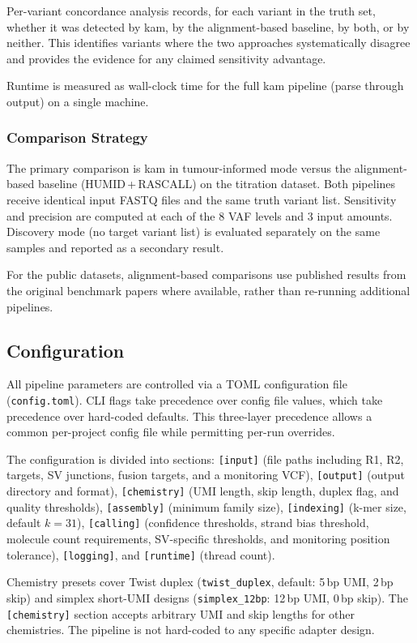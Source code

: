 Per-variant concordance analysis records, for each variant in the truth set, whether it was detected by kam, by the alignment-based baseline, by both, or by neither.
This identifies variants where the two approaches systematically disagree and provides the evidence for any claimed sensitivity advantage.

Runtime is measured as wall-clock time for the full kam pipeline (parse through output) on a single machine.

\subsubsection{Comparison Strategy}

The primary comparison is kam in tumour-informed mode versus the alignment-based baseline (HUMID\,+\,RASCALL) on the titration dataset.
Both pipelines receive identical input FASTQ files and the same truth variant list.
Sensitivity and precision are computed at each of the 8 VAF levels and 3 input amounts.
Discovery mode (no target variant list) is evaluated separately on the same samples and reported as a secondary result.

For the public datasets, alignment-based comparisons use published results from the original benchmark papers where available, rather than re-running additional pipelines.

\subsection{Configuration}
\label{sec:method:config}

All pipeline parameters are controlled via a TOML configuration file (\texttt{config.toml}). CLI flags take precedence over config file values, which take precedence over hard-coded defaults. This three-layer precedence allows a common per-project config file while permitting per-run overrides.

The configuration is divided into sections: \texttt{[input]} (file paths including R1, R2, targets, SV junctions, fusion targets, and a monitoring VCF), \texttt{[output]} (output directory and format), \texttt{[chemistry]} (UMI length, skip length, duplex flag, and quality thresholds), \texttt{[assembly]} (minimum family size), \texttt{[indexing]} (k-mer size, default $k = 31$), \texttt{[calling]} (confidence thresholds, strand bias threshold, molecule count requirements, SV-specific thresholds, and monitoring position tolerance), \texttt{[logging]}, and \texttt{[runtime]} (thread count).

Chemistry presets cover Twist duplex (\texttt{twist\_duplex}, default: 5\,bp UMI, 2\,bp skip) and simplex short-UMI designs (\texttt{simplex\_12bp}: 12\,bp UMI, 0\,bp skip). The \texttt{[chemistry]} section accepts arbitrary UMI and skip lengths for other chemistries. The pipeline is not hard-coded to any specific adapter design.
